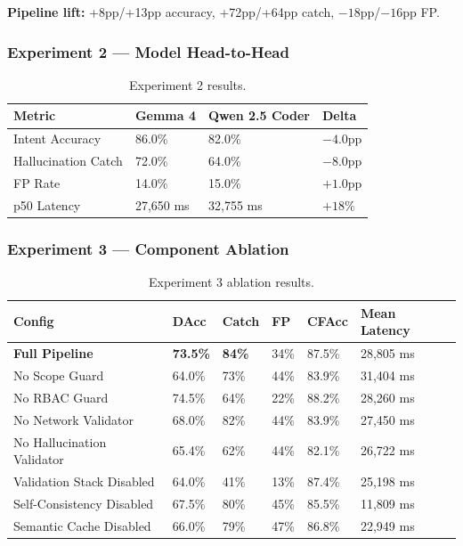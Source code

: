 ﻿\documentclass[10pt,journal,onecolumn]{IEEEtran}
\begin{document}
\noindent\textbf{Pipeline lift:} +8pp/+13pp accuracy, +72pp/+64pp catch, $-18$pp/$-16$pp FP.

\subsubsection{Experiment 2 --- Model Head-to-Head}
\begin{table}[h]
\caption{Experiment 2 results.}
\label{tab:exp2}
\begin{tabularx}{\columnwidth}{l X X X}
\toprule
\textbf{Metric} & \textbf{Gemma 4} & \textbf{Qwen 2.5 Coder} & \textbf{Delta}\\
\midrule
Intent Accuracy & 86.0\% & 82.0\% & $-4.0$pp\\
Hallucination Catch & 72.0\% & 64.0\% & $-8.0$pp\\
FP Rate & 14.0\% & 15.0\% & $+1.0$pp\\
p50 Latency & 27,650 ms & 32,755 ms & $+18\%$\\
\bottomrule
\end{tabularx}
\end{table}

\subsubsection{Experiment 3 --- Component Ablation}
\begin{table}[t]
\caption{Experiment 3 ablation results.}
\label{tab:exp3}
\begin{tabularx}{\textwidth}{l X X X X X}
\toprule
\textbf{Config} & \textbf{DAcc} & \textbf{Catch} & \textbf{FP} & \textbf{CFAcc} & \textbf{Mean Latency}\\
\midrule
\textbf{Full Pipeline} & \textbf{73.5\%} & \textbf{84\%} & 34\% & 87.5\% & 28,805 ms\\
No Scope Guard & 64.0\% & 73\% & 44\% & 83.9\% & 31,404 ms\\
No RBAC Guard & 74.5\% & 64\% & 22\% & 88.2\% & 28,260 ms\\
No Network Validator & 68.0\% & 82\% & 44\% & 83.9\% & 27,450 ms\\
No Hallucination Validator & 65.4\% & 62\% & 44\% & 82.1\% & 26,722 ms\\
Validation Stack Disabled & 64.0\% & 41\% & 13\% & 87.4\% & 25,198 ms\\
Self-Consistency Disabled & 67.5\% & 80\% & 45\% & 85.5\% & 11,809 ms\\
Semantic Cache Disabled & 66.0\% & 79\% & 47\% & 86.8\% & 22,949 ms\\
\bottomrule
\end{tabularx}
\end{table}
\end{document}
